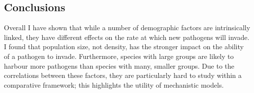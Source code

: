 \subsection{Conclusions}

Overall I have shown that while a number of demographic factors are intrinsically linked, they have different effects on the rate at which new pathogens will invade.
I found that population size, not density, has the stronger impact on the ability of a pathogen to invade.
Furthermore, species with large groups are likely to harbour more pathogens than species with many, smaller groups.
Due to the correlations between these factors, they are particularly hard to study within a comparative framework; this highlights the utility of mechanistic models.












